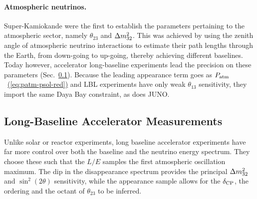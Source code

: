 \paragraph{Atmospheric neutrinos.} 
Super-Kamiokande were the first to establish the parameters pertaining to the atmospheric sector, namely
$\theta_{23}$ and $\Delta m^{2}_{32}$. This was achieved by using the zenith angle of atmospheric neutrino 
interactions to estimate their path lengths through the Earth, from down-going to up-going, thereby 
achieving different baselines. Today however, accelerator long-baseline experiments lead the precision 
on these parameters (Sec.~\ref{sec:landscape-lbl}). Because the leading appearance term goes as
$P_{\rm atm}$~\hyperref[eq:patm-psol-red]{(\ref{eq:patm-psol-red})} and LBL experiments have only
weak $\theta_{13}$ sensitivity, they import the same Daya Bay constraint, as does JUNO.


\subsection{Long-Baseline Accelerator Measurements}
\label{sec:landscape-lbl}
Unlike solar or reactor experiments, long baseline accelerator experiments have far more control over both 
the baseline and the neutrino energy spectrum. They choose these such that the $L/E$ samples the first 
atmospheric oscillation maximum. The dip in the disappearance spectrum provides the principal 
$\Delta m^{2}_{32}$ and $\sin^2(2\theta)$ sensitivity, while the appearance sample allows for the $\delta_{\rm CP}$, the ordering and
the octant of $\theta_{23}$ to be inferred.




